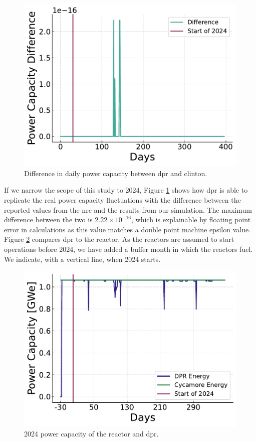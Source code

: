 \begin{figure}[H]
  \centering
  \includegraphics[width=0.7\linewidth]{images/power_reactor/dpr_diff.pdf}
  \caption{Difference in daily power capacity between \gls{dpr} and \gls{clinton}.}
  \label{fig:dpr_clinton_diff}
\end{figure}


If we narrow the scope of this study to 2024, Figure \ref{fig:dpr_clinton_diff} shows how \gls{dpr} is able to replicate the real power capacity fluctuations with the difference between the reported values from the \gls{nrc} \cite{nrc_power_2025} and the results from our \cyclus simulation. The maximum difference between the two is $2.22 \times 10^{-16}$, which is explainable by floating point error in calculations as this value matches a double point machine epsilon value. Figure \ref{fig:dpr_cycamore_power} compares \gls{dpr} to the \cycamore reactor. As the reactors are assumed to start operations before 2024, we have added a buffer month in which the reactors fuel. We indicate, with a vertical line, when 2024 starts.


\begin{figure}[H]
  \centering
  \includegraphics[width=0.7\linewidth]{images/power_reactor/dpr_cycamore_energy.pdf}
  \caption{2024 power capacity of the \cycamore reactor and \gls{dpr}.}
  \label{fig:dpr_cycamore_power}
\end{figure}


